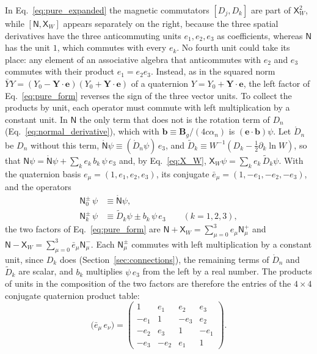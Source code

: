 \documentclass[aps,prd,onecolumn,tightenlines,nofootinbib,notitlepage,11pt,floatfix]{revtex4-2}
\theoremstyle{indentedtheorem}
\begin{document}
In Eq.~\eqref{eq:pure_expanded} the magnetic commutators $[D_j,D_k]$ are part of $\mathsf{X}_W^2$, while $[\mathsf{N},\mathsf{X}_W]$ appears separately on the right, because the three spatial derivatives have the three anticommuting units $e_1,e_2,e_3$ as coefficients, whereas $\mathsf{N}$ has the unit $1$, which commutes with every $e_k$. No fourth unit could take its place: any element of an associative algebra that anticommutes with $e_2$ and $e_3$ commutes with their product $e_1=e_2e_3$. Instead, as in the squared norm $\bar{Y}Y=(Y_0-\mathbf{Y}\cdot\mathbf{e})(Y_0+\mathbf{Y}\cdot\mathbf{e})$ of a quaternion $Y=Y_0+\mathbf{Y}\cdot\mathbf{e}$, the left factor of Eq.~\eqref{eq:pure_form} reverses the sign of the three vector units. To collect the products by unit, each operator must commute with left multiplication by a constant unit. In $\mathsf{N}$ the only term that does not is the rotation term of $D_n$ (Eq.~\eqref{eq:normal_derivative}), which with $\mathbf{b} \equiv \mathbf{B}_g/(4c\alpha_n)$ is $(\mathbf{e}\cdot\mathbf{b})\psi$. Let $\mathring{D}_n$ be $D_n$ without this term, $\mathring{\mathsf{N}}\psi \equiv (\mathring{D}_n\psi)\,e_3$, and $\tilde{D}_k \equiv W^{-1}(D_k - \tfrac{1}{2}\partial_k\ln W)$, so that $\mathsf{N}\psi = \mathring{\mathsf{N}}\psi + \sum_k e_k\,b_k\,\psi\,e_3$ and, by Eq.~\eqref{eq:X_W}, $\mathsf{X}_W\psi = \sum_k e_k\,\tilde{D}_k\psi$. With the quaternion basis $e_\mu = (1,e_1,e_2,e_3)$, its conjugate $\bar{e}_\mu = (1,-e_1,-e_2,-e_3)$, and the operators
\begin{align*}
    \mathsf{N}_0^\pm\,\psi &\equiv \mathring{\mathsf{N}}\psi , \\
    \mathsf{N}_k^\pm\,\psi &\equiv \tilde{D}_k\psi \pm b_k\,\psi\,e_3 \qquad (k=1,2,3),
\end{align*}
the two factors of Eq.~\eqref{eq:pure_form} are $\mathsf{N}+\mathsf{X}_W = \sum_{\mu=0}^3 e_\mu\mathsf{N}_\mu^+$ and $\mathsf{N}-\mathsf{X}_W = \sum_{\mu=0}^3 \bar{e}_\mu\mathsf{N}_\mu^-$. Each $\mathsf{N}_\mu^\pm$ commutes with left multiplication by a constant unit, since $D_k$ does (Section~\ref{sec:connections}), the remaining terms of $\mathring{D}_n$ and $\tilde{D}_k$ are scalar, and $b_k$ multiplies $\psi\,e_3$ from the left by a real number. The products of units in the composition of the two factors are therefore the entries of the $4\times 4$ conjugate quaternion product table:
\begin{equation}
    \big(\bar{e}_\mu \, e_\nu\big) = \begin{pmatrix}
    1 & e_1 & e_2 & e_3 \\
    -e_1 & 1 & -e_3 & e_2 \\
    -e_2 & e_3 & 1 & -e_1 \\
    -e_3 & -e_2 & e_1 & 1
    \end{pmatrix} .
    \label{eq:conjugate_unit_table}
\end{equation}
\end{document}
